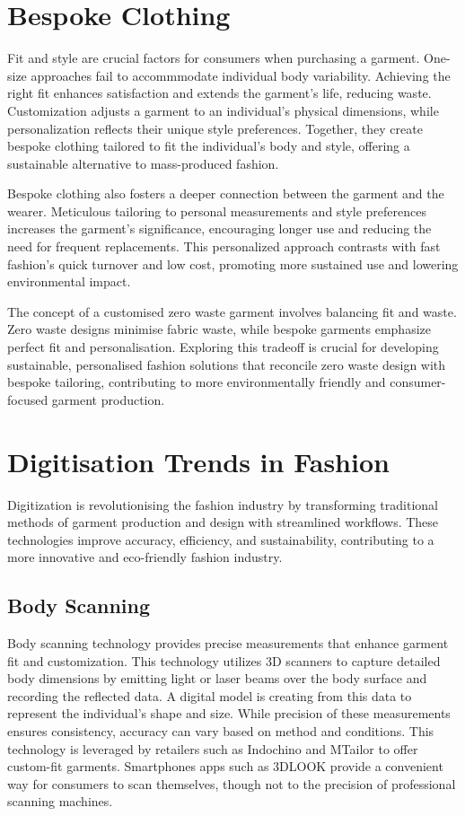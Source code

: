 \section{Bespoke Clothing}
Fit and style are crucial factors for consumers when purchasing a garment. One-size approaches fail to accommmodate individual body variability. Achieving the right fit enhances satisfaction and extends the garment's life, reducing waste. Customization adjusts a garment to an individual's physical dimensions, while personalization reflects their unique style preferences. Together, they create bespoke clothing tailored to fit the individual's body and style, offering a sustainable alternative to mass-produced fashion.

Bespoke clothing also fosters a deeper connection between the garment and the wearer. Meticulous tailoring to personal measurements and style preferences increases the garment's significance, encouraging longer use and reducing the need for frequent replacements. This personalized approach contrasts with fast fashion's quick turnover and low cost, promoting more sustained use and lowering environmental impact.

The concept of a customised zero waste garment involves balancing fit and waste. Zero waste designs minimise fabric waste, while bespoke garments emphasize perfect fit and personalisation. Exploring this tradeoff is crucial for developing sustainable, personalised fashion solutions that reconcile zero waste design with bespoke tailoring, contributing to more environmentally friendly and consumer-focused garment production.

\section{Digitisation Trends in Fashion}
Digitization is revolutionising the fashion industry by transforming traditional methods of garment production and design with streamlined workflows. These technologies improve accuracy, efficiency, and sustainability, contributing to a more innovative and eco-friendly fashion industry.

\subsection{Body Scanning}
Body scanning technology provides precise measurements that enhance garment fit and customization. This technology utilizes 3D scanners to capture detailed body dimensions by emitting light or laser beams over the body surface and recording the reflected data. A digital model is creating from this data to represent the individual's shape and size. While precision of these measurements ensures consistency, accuracy can vary based on method and conditions. This technology is leveraged by retailers such as Indochino and MTailor to offer custom-fit garments. Smartphones apps such as 3DLOOK provide a convenient way for consumers to scan themselves, though not to the precision of professional scanning machines.

